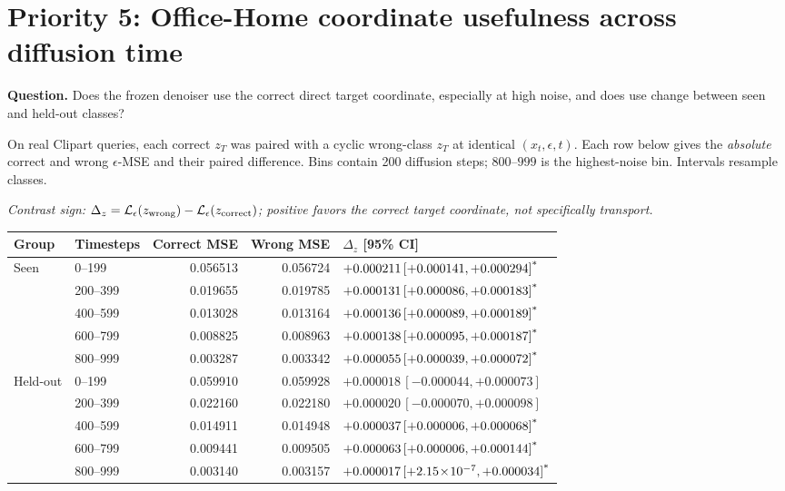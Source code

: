 \documentclass[10pt]{article}
\newcommand{\sig}{\textsuperscript{*}}
\begin{document}
\section*{Priority 5: Office-Home coordinate usefulness across diffusion time}

\textbf{Question.} Does the frozen denoiser use the correct direct target coordinate, especially at high noise, and does use change between seen and held-out classes?

On real Clipart queries, each correct $z_T$ was paired with a cyclic wrong-class $z_T$ at identical $(x_t,\epsilon,t)$. Each row below gives the \emph{absolute} correct and wrong $\epsilon$-MSE and their paired difference. Bins contain 200 diffusion steps; $800$--$999$ is the highest-noise bin. Intervals resample classes.

\emph{Contrast sign: $\Delta_z=\mathcal L_\epsilon(z_{\rm wrong})-\mathcal L_\epsilon(z_{\rm correct})$; positive favors the correct target coordinate, not specifically transport.}

\begin{center}\small
\begin{tabular}{llrrl}
\toprule
Group & Timesteps & Correct MSE & Wrong MSE & $\Delta_z$ [95\% CI]\\
\midrule
Seen & 0--199 & 0.056513 & 0.056724 & $+0.000211\,[+0.000141,+0.000294]\sig$\\
 & 200--399 & 0.019655 & 0.019785 & $+0.000131\,[+0.000086,+0.000183]\sig$\\
 & 400--599 & 0.013028 & 0.013164 & $+0.000136\,[+0.000089,+0.000189]\sig$\\
 & 600--799 & 0.008825 & 0.008963 & $+0.000138\,[+0.000095,+0.000187]\sig$\\
 & 800--999 & 0.003287 & 0.003342 & $+0.000055\,[+0.000039,+0.000072]\sig$\\
\midrule
Held-out & 0--199 & 0.059910 & 0.059928 & $+0.000018\,[-0.000044,+0.000073]$\\
 & 200--399 & 0.022160 & 0.022180 & $+0.000020\,[-0.000070,+0.000098]$\\
 & 400--599 & 0.014911 & 0.014948 & $+0.000037\,[+0.000006,+0.000068]\sig$\\
 & 600--799 & 0.009441 & 0.009505 & $+0.000063\,[+0.000006,+0.000144]\sig$\\
 & 800--999 & 0.003140 & 0.003157 & $+0.000017\,[+2.15\!\times\!10^{-7},+0.000034]\sig$\\
\bottomrule
\end{tabular}
\end{center}
\end{document}
